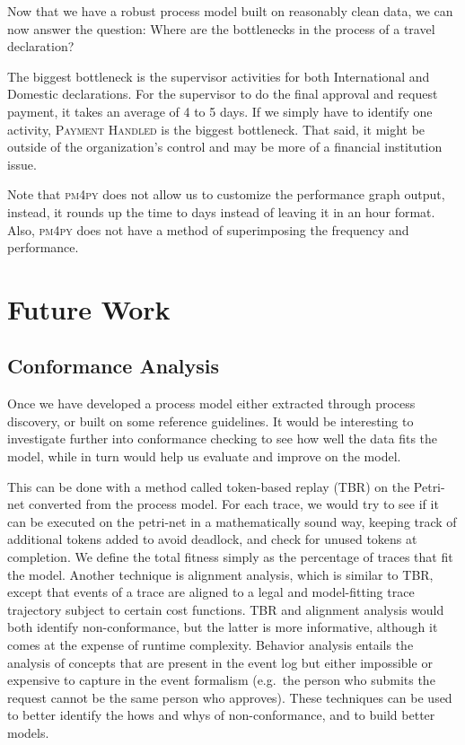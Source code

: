 \documentclass[conference]{IEEEtran}
\begin{document}
Now that we have a robust process model built on reasonably clean data,
we can now answer the question: 
Where are the bottlenecks in the process of a travel declaration?

The biggest bottleneck is the supervisor activities for both International
and Domestic declarations. For the supervisor to do the final approval and
request payment, it takes an average of 4 to 5 days.
If we simply have to identify one activity, \textsc{Payment Handled}
is the biggest bottleneck. That said,
it might be outside of the organization’s control and may be more of a
financial institution issue.

Note that \textsc{pm4py} does not allow us to customize the performance
graph output,
instead, it rounds up the time to days instead of leaving it in an hour format. Also, \textsc{pm4py} does not have a method of superimposing the frequency and performance.


\section{Future Work}
\label{section-future}

\subsection{Conformance Analysis}

Once we have developed a process model either extracted through process
discovery, or built on some reference guidelines. It would be
interesting to investigate further into conformance checking to see how
well the data fits the model, while in turn would help us evaluate and
improve on the model.

This can be done with a method called token-based replay (TBR) on the
Petri-net converted from the process model. For each trace, we would try
to see if it can be executed on the petri-net in a mathematically sound
way, keeping track of additional tokens added to avoid deadlock, and
check for unused tokens at completion. We define the total fitness
simply as the percentage of traces that fit the model. Another technique
is alignment analysis, which is similar to TBR, except that events of a
trace are aligned to a legal and model-fitting trace trajectory subject
to certain cost functions. TBR and alignment analysis would both
identify non-conformance, but the latter is more informative, although
it comes at the expense of runtime complexity. Behavior analysis entails
the analysis of concepts that are present in the event log but either
impossible or expensive to capture in the event formalism (e.g.~the
person who submits the request cannot be the same person who approves).
These techniques can be used to better identify the hows and whys of
non-conformance, and to build better models.
\end{document}
